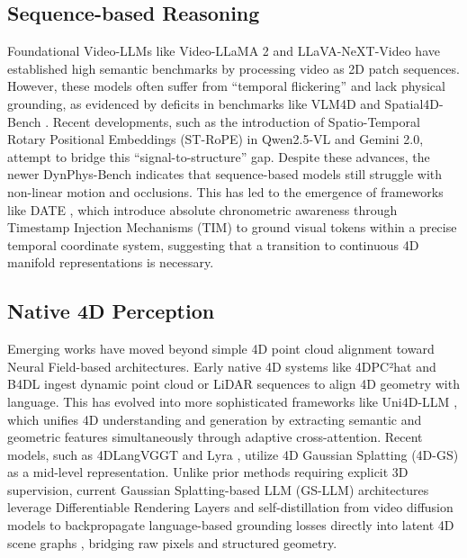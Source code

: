 \documentclass[12pt]{article}
\begin{document}
\subsection{Sequence-based Reasoning}
Foundational Video-LLMs like Video-LLaMA 2 \cite{cheng2024videollama2advancingspatialtemporal} and LLaVA-NeXT-Video \cite{zhang2024llavanextvideo} have established high semantic benchmarks by processing video as 2D patch sequences. However, these models often suffer from ``temporal flickering'' and lack physical grounding, as evidenced by deficits in benchmarks like VLM4D \cite{zhou2025vlm4dspatiotemporalawarenessvision} and Spatial4D-Bench \cite{wang2025spatial4dbenchversatile4dspatial}. Recent developments, such as the introduction of Spatio-Temporal Rotary Positional Embeddings (ST-RoPE) in Qwen2.5-VL and Gemini 2.0, attempt to bridge this ``signal-to-structure'' gap. Despite these advances, the newer DynPhys-Bench \cite{zhang2025abenchphysicsbenchmarkingphysicalreasoning} indicates that sequence-based models still struggle with non-linear motion and occlusions. This has led to the emergence of frameworks like DATE \cite{yuan2025date}, which introduce absolute chronometric awareness through Timestamp Injection Mechanisms (TIM) to ground visual tokens within a precise temporal coordinate system, suggesting that a transition to continuous 4D manifold representations is necessary.

\subsection{Native 4D Perception}
Emerging works have moved beyond simple 4D point cloud alignment toward Neural Field-based architectures. Early native 4D systems like 4DPC²hat \cite{zhang20264dpc2hatdynamicpointcloud} and B4DL \cite{Choi_2025} ingest dynamic point cloud or LiDAR sequences to align 4D geometry with language. This has evolved into more sophisticated frameworks like Uni4D-LLM \cite{zhou2025uni4dllmunifiedspatiotemporalawarevlm}, which unifies 4D understanding and generation by extracting semantic and geometric features simultaneously through adaptive cross-attention. Recent models, such as 4DLangVGGT \cite{wu20254dlangvggt4dlanguagevisualgeometry} and Lyra \cite{bahmani2025lyra}, utilize 4D Gaussian Splatting (4D-GS) as a mid-level representation. Unlike prior methods requiring explicit 3D supervision, current Gaussian Splatting-based LLM (GS-LLM) architectures leverage Differentiable Rendering Layers and self-distillation from video diffusion models to backpropagate language-based grounding losses directly into latent 4D scene graphs \cite{wang2025vggtvisualgeometrygrounded}, bridging raw pixels and structured geometry.
\end{document}
